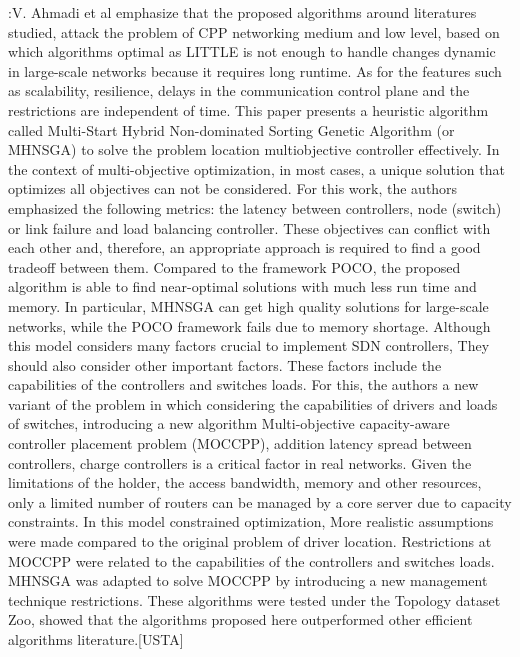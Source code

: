 \documentclass[a4paper,10pt]{article}
\begin{document}
\cite{VaMo18}:V. Ahmadi et al emphasize that the proposed algorithms around literatures studied, attack the problem of CPP networking medium and low level, based on which algorithms optimal as LITTLE is not enough to handle changes dynamic in large-scale networks because it requires long runtime. As for the features such as scalability, resilience, delays in the communication control plane and the restrictions are independent of time. This paper presents a heuristic algorithm called Multi-Start Hybrid Non-dominated Sorting Genetic Algorithm (or MHNSGA) to solve the problem location multiobjective controller effectively. In the context of multi-objective optimization, in most cases, a unique solution that optimizes all objectives can not be considered. For this work, the authors emphasized the following metrics: the latency between controllers, node (switch) or link failure and load balancing controller. These objectives can conflict with each other and, therefore, an appropriate approach is required to find a good tradeoff between them. Compared to the framework POCO, the proposed algorithm is able to find near-optimal solutions with much less run time and memory. In particular, MHNSGA can get high quality solutions for large-scale networks, while the POCO framework fails due to memory shortage. Although this model considers many factors crucial to implement SDN controllers, They should also consider other important factors. These factors include the capabilities of the controllers and switches loads. For this, the authors a new variant of the problem in which considering the capabilities of drivers and loads of switches, introducing a new algorithm Multi-objective capacity-aware controller placement problem (MOCCPP), addition latency spread between controllers, charge controllers is a critical factor in real networks. Given the limitations of the holder, the access bandwidth, memory and other resources, only a limited number of routers can be managed by a core server due to capacity constraints. In this model constrained optimization, More realistic assumptions were made compared to the original problem of driver location. Restrictions at MOCCPP were related to the capabilities of the controllers and switches loads. MHNSGA was adapted to solve MOCCPP by introducing a new management technique restrictions. These algorithms were tested under the Topology dataset Zoo, showed that the algorithms proposed here outperformed other efficient algorithms literature.[USTA]
\end{document}
